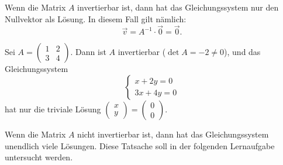 Wenn die Matrix $A$ invertierbar ist, dann hat das Gleichungssystem nur den Nullvektor als Lösung. 
In diesem Fall gilt nämlich:
$$ \vec{v} = A^{-1}\cdot \vec{0} = \vec{0}.$$

\begin{bsp}{}{}
Sei $A = \begin{pmatrix} 1 & 2 \\ 3 & 4 \end{pmatrix}$. Dann ist $A$ invertierbar ($\det A = -2 \neq0$), und das Gleichungssystem
\[
\begin{cases}
x+2y = 0 \\
3x+4y = 0
\end{cases}
\]
hat nur die triviale Lösung $\begin{pmatrix}
    x \\ y 
\end{pmatrix} = \begin{pmatrix} 0 \\ 0 \end{pmatrix}$.
\end{bsp}

Wenn die Matrix $A$ nicht invertierbar ist, dann hat das Gleichungssystem unendlich viele Lösungen. Diese Tatsache soll in der folgenden Lernaufgabe untersucht werden.

